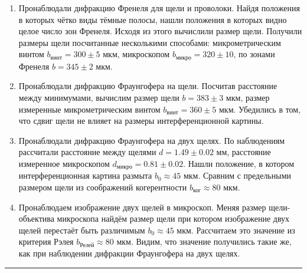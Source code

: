 \documentclass[a4paper,12pt]{article} %
\begin{document}
\begin{enumerate}
\item Пронаблюдали дифракцию Френеля для щели и проволоки. Найдя положения в которых чётко виды тёмные полосы, нашли положения в которых видно целое число зон Френеля. Исходя из этого вычислили размер щели. Получили размеры щели посчитанные несколькими способами: микрометрическим винтом $b_\text{винт} = 300 \pm 5$ мкм, микроскопом $b_\text{микро} = 320 \pm 10$, по зонами Френеля $b = 345 \pm 2$ мкм.

\item Пронаблюдали дифракцию Фраунгофера на щели. Посчитав расстояние между минимумами, вычислим размер щели $b = 383 \pm 3$ мкм, размер измеренные микрометрическим винтом $b_\text{винт} = 360 \pm 5$ мкм. Убедились в том, что сдвиг щели не влияет на размеры интерференционной картины.

\item Пронаблюдали дифракцию Фраунгофера на двух щелях. По наблюдениям рассчитали расстояние между щелями $d = 1.49 \pm 0.02$ мм, расстояние измеренное микроскопом $d_\text{микро} = 0.81 \pm 0.02$. Нашли положение, в котором интерференционная картина размыта $b_0 \approx 45$ мкм. Сравним с предельными размером щели из соображений когерентности $b_\text{ког} \approx 80$ мкм.

\item Пронаблюдаем изображение двух щелей в микроскоп. Меняя размер щели-объектива микроскопа найдём размер щели при котором изображение двух щелей перестаёт быть различимым $b_0 \approx 45$ мкм. Рассчитаем это значение из критерия Рэлея $b_\text{Релей} \approx 80$ мкм. Видим, что значение получились такие же, как при наблюдении дифракции Фраунгофера на двух щелях.


\end{enumerate}


\medskip\hrule\medskip
\end{document}
